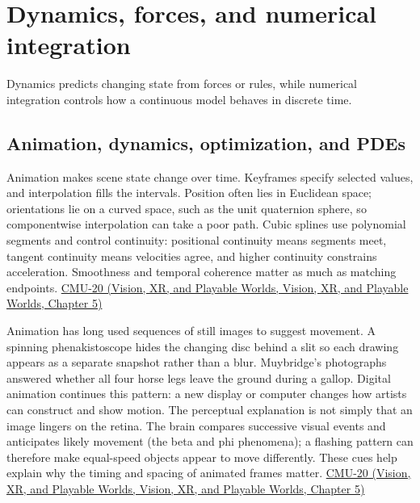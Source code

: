 \section{Dynamics, forces, and numerical integration}\label{04-visual-computing-ii-ch029-dynamics-forces-and-numerical-integration}

Dynamics predicts changing state from forces or rules, while numerical integration controls how a continuous model behaves in discrete time.

\subsection{Animation, dynamics, optimization, and PDEs}\label{04-visual-computing-ii-ch029-animation-dynamics-optimization-and-pdes}

Animation makes scene state change over time. Keyframes specify selected values, and interpolation fills the intervals. Position often lies in Euclidean space; orientations lie on a curved space, such as the unit quaternion sphere, so componentwise interpolation can take a poor path. Cubic splines use polynomial segments and control continuity: positional continuity means segments meet, tangent continuity means velocities agree, and higher continuity constrains acceleration. Smoothness and temporal coherence matter as much as matching endpoints. \href{../07-Vision-XR-and-Playable-Worlds/main.pdf\#nameddest=04-visual-computing-ii-ch036-cmu-20---introduction-to-animation}{CMU-20 (Vision, XR, and Playable Worlds, Vision, XR, and Playable Worlds, Chapter 5)}

Animation has long used sequences of still images to suggest movement. A spinning phenakistoscope hides the changing disc behind a slit so each drawing appears as a separate snapshot rather than a blur. Muybridge's photographs answered whether all four horse legs leave the ground during a gallop. Digital animation continues this pattern: a new display or computer changes how artists can construct and show motion. The perceptual explanation is not simply that an image lingers on the retina. The brain compares successive visual events and anticipates likely movement (the beta and phi phenomena); a flashing pattern can therefore make equal-speed objects appear to move differently. These cues help explain why the timing and spacing of animated frames matter. \href{../07-Vision-XR-and-Playable-Worlds/main.pdf\#nameddest=04-visual-computing-ii-ch036-cmu-20---introduction-to-animation}{CMU-20 (Vision, XR, and Playable Worlds, Vision, XR, and Playable Worlds, Chapter 5)}

